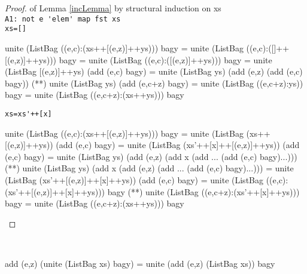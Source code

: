 \begin{proof} of Lemma \ref{incLemma} by structural induction on xs\\
\verb|A1: not e 'elem' map fst xs|\\
\verb|xs=[]|
\begin{code}
unite (ListBag ((e,c):(xs++[(e,z)]++ys))) bagy 
                 = unite (ListBag ((e,c):([]++[(e,z)]++ys))) bagy
                 = unite (ListBag ((e,c):([(e,z)]++ys))) bagy
                 = unite (ListBag [(e,z)]++ys) (add (e,c) bagy)
                 = unite (ListBag ys) (add (e,z) (add (e,c) bagy))
                 (*\sEq{\ref{addSameLemma}}*) unite (ListBag ys) (add (e,c+z) bagy)
                 = unite (ListBag ((e,c+z):ys)) bagy
                 = unite (ListBag ((e,c+z):(xs++ys))) bagy
\end{code}
\verb|xs=xs'++[x]|
\begin{code}
unite (ListBag ((e,c):(xs++[(e,z)]++ys))) bagy 
  = unite (ListBag (xs++[(e,z)]++ys)) (add (e,c) bagy)
  = unite (ListBag (xs'++[x]++[(e,z)]++ys)) (add (e,c) bagy)
  = unite (ListBag ys) (add (e,z) (add x (add ... (add (e,c) bagy)...)))
  (*\sEq{\ref{addDiffLemma}}*) unite (ListBag ys) (add x (add (e,z) (add ... (add (e,c) bagy)...)))
  = unite (ListBag (xs'++[(e,z)]++[x]++ys)) (add (e,c) bagy)
  = unite (ListBag ((e,c):(xs'++[(e,z)]++[x]++ys))) bagy
  (**) unite (ListBag ((e,c+z):(xs'++[x]++ys))) bagy
  = unite (ListBag ((e,c+z):(xs++ys))) bagy
\end{code}
\end{proof}
\begin{lemma}\label{addLemma}\ 
\begin{code}
add (e,z) (unite (ListBag xs) bagy)
                 = unite (add (e,z) (ListBag xs)) bagy
\end{code}
\end{lemma}
